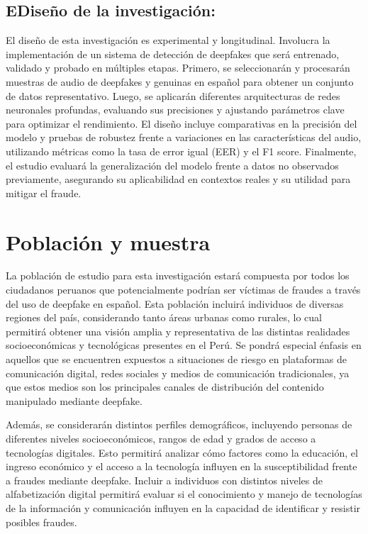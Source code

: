 \subsection{EDiseño de la investigación:}
El diseño de esta investigación es experimental y longitudinal. Involucra la implementación de un sistema de detección de deepfakes que será entrenado, validado y probado en múltiples etapas. Primero, se seleccionarán y procesarán muestras de audio de deepfakes y genuinas en español para obtener un conjunto de datos representativo. Luego, se aplicarán diferentes arquitecturas de redes neuronales profundas, evaluando sus precisiones y ajustando parámetros clave para optimizar el rendimiento. El diseño incluye comparativas en la precisión del modelo y pruebas de robustez frente a variaciones en las características del audio, utilizando métricas como la tasa de error igual (EER) y el F1 score. Finalmente, el estudio evaluará la generalización del modelo frente a datos no observados previamente, asegurando su aplicabilidad en contextos reales y su utilidad para mitigar el fraude.

\section{Población y muestra}

La población de estudio para esta investigación estará compuesta por todos los ciudadanos peruanos que potencialmente podrían ser víctimas de fraudes a través del uso de deepfake en español. Esta población incluirá individuos de diversas regiones del país, considerando tanto áreas urbanas como rurales, lo cual permitirá obtener una visión amplia y representativa de las distintas realidades socioeconómicas y tecnológicas presentes en el Perú. Se pondrá especial énfasis en aquellos que se encuentren expuestos a situaciones de riesgo en plataformas de comunicación digital, redes sociales y medios de comunicación tradicionales, ya que estos medios son los principales canales de distribución del contenido manipulado mediante deepfake.

Además, se considerarán distintos perfiles demográficos, incluyendo personas de diferentes niveles socioeconómicos, rangos de edad y grados de acceso a tecnologías digitales. Esto permitirá analizar cómo factores como la educación, el ingreso económico y el acceso a la tecnología influyen en la susceptibilidad frente a fraudes mediante deepfake. Incluir a individuos con distintos niveles de alfabetización digital permitirá evaluar si el conocimiento y manejo de tecnologías de la información y comunicación influyen en la capacidad de identificar y resistir posibles fraudes.

